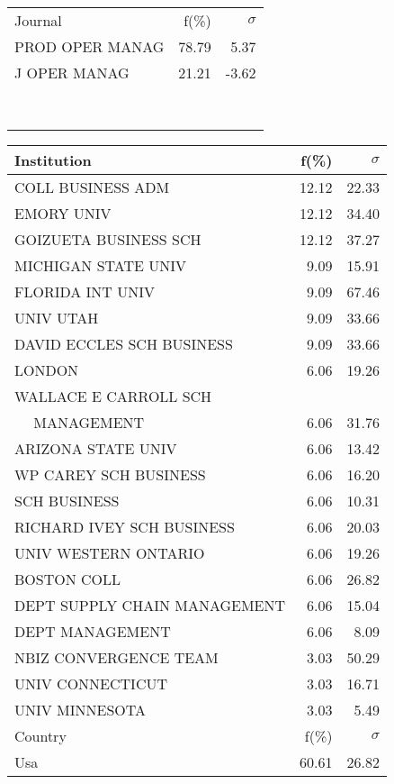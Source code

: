 \documentclass[a4paper,11pt]{report}
\begin{document}
\begin{landscape}
\begin{table}[!ht]
{\begin{tabular}{|l r  r|}
 &  & \\
\hline
\hline
Journal & f(\%) & $\sigma$\\
\hline
PROD OPER MANAG & 78.79 & 5.37\\
J OPER MANAG & 21.21 & -3.62\\
 &  & \\
 &  & \\
 &  & \\
 &  & \\
 &  & \\
 &  & \\
 &  & \\
 &  & \\
\hline
\end{tabular}
}
{\scriptsize\begin{tabular}{|l r r|}
\hline
Institution & f(\%) & $\sigma$\\
\hline
COLL BUSINESS ADM & 12.12 & 22.33\\
EMORY UNIV & 12.12 & 34.40\\
GOIZUETA BUSINESS SCH & 12.12 & 37.27\\
MICHIGAN STATE UNIV & 9.09 & 15.91\\
FLORIDA INT UNIV & 9.09 & 67.46\\
UNIV UTAH & 9.09 & 33.66\\
DAVID ECCLES SCH BUSINESS & 9.09 & 33.66\\
LONDON & 6.06 & 19.26\\
WALLACE E CARROLL SCH &  & \\
$\quad$ MANAGEMENT & 6.06 & 31.76\\
ARIZONA STATE UNIV & 6.06 & 13.42\\
WP CAREY SCH BUSINESS & 6.06 & 16.20\\
SCH BUSINESS & 6.06 & 10.31\\
RICHARD IVEY SCH BUSINESS & 6.06 & 20.03\\
UNIV WESTERN ONTARIO & 6.06 & 19.26\\
BOSTON COLL & 6.06 & 26.82\\
DEPT SUPPLY CHAIN MANAGEMENT & 6.06 & 15.04\\
DEPT MANAGEMENT & 6.06 & 8.09\\
NBIZ CONVERGENCE TEAM & 3.03 & 50.29\\
UNIV CONNECTICUT & 3.03 & 16.71\\
UNIV MINNESOTA & 3.03 & 5.49\\
\hline
\hline
Country & f(\%) & $\sigma$\\
\hline
Usa & 60.61 & 26.82\\

\end{tabular}}
\end{table}
\end{landscape}
\end{document}
